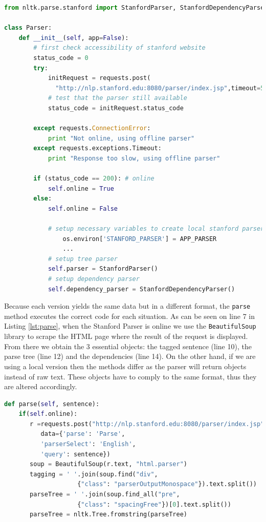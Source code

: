 \documentclass[12pt]{ociamthesis}  %
\newcommand{\tech}{\texttt}
\begin{document}
{\begin{lstlisting}[language=Python, caption = Parser object creation from the Stanford implementation, label = lst:parser]
from nltk.parse.stanford import StanfordParser, StanfordDependencyParser

class Parser:
    def __init__(self, app=False):
        # first check accessibility of stanford website
        status_code = 0
        try:
            initRequest = requests.post(
              "http://nlp.stanford.edu:8080/parser/index.jsp",timeout=5) 
            # test that the parser still available
            status_code = initRequest.status_code

        except requests.ConnectionError:
            print "Not online, using offline parser"
        except requests.exceptions.Timeout:
            print "Response too slow, using offline parser"

        if (status_code == 200): # online
            self.online = True
        else:
            self.online = False

            # setup necessary variables to create local stanford parser
                os.environ['STANFORD_PARSER'] = APP_PARSER
                ...
            # setup tree parser
            self.parser = StanfordParser()
            # setup dependency parser
            self.dependency_parser = StanfordDependencyParser()
\end{lstlisting}
Because each version yields the same data but in a different format, the \texttt{parse} method executes the correct code for each situation. As can be seen on line 7 in Listing \ref{lst:parse}, when the Stanford Parser is online we use the \tech{BeautifulSoup} library to scrape the HTML page where the result of the request is displayed. From there we obtain the 3 essential objects: the tagged sentence (line 10), the parse tree (line 12) and the dependencies (line 14). On the other hand, if we are using a local version then the methods differ as the parser will return objects instead of raw text. These objects have to comply to the same format, thus they are altered accordingly.

\begin{lstlisting}[language=Python, caption = Obtaining the data from the remote or local parser, label = lst:parse]
def parse(self, sentence):
    if(self.online):
       r =requests.post("http://nlp.stanford.edu:8080/parser/index.jsp",
          data={'parse': 'Parse', 
          'parserSelect': 'English', 
          'query': sentence})
       soup = BeautifulSoup(r.text, "html.parser")
       tagging = ' '.join(soup.find("div", 
                    {"class": "parserOutputMonospace"}).text.split())
       parseTree = ' '.join(soup.find_all("pre", 
                    {"class": "spacingFree"})[0].text.split())
       parseTree = nltk.Tree.fromstring(parseTree)


\end{lstlisting}}
\end{document}
